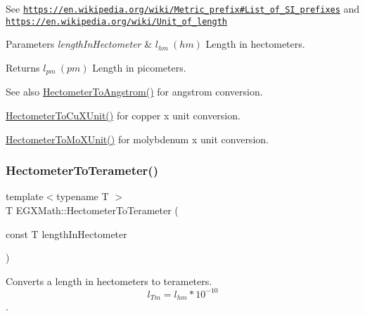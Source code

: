 See \href{https://en.wikipedia.org/wiki/Metric_prefix#List_of_SI_prefixes}{\tt https\+://en.\+wikipedia.\+org/wiki/\+Metric\+\_\+prefix\#\+List\+\_\+of\+\_\+\+S\+I\+\_\+prefixes} and \href{https://en.wikipedia.org/wiki/Unit_of_length}{\tt https\+://en.\+wikipedia.\+org/wiki/\+Unit\+\_\+of\+\_\+length} 
\begin{DoxyParams}{Parameters}
{\em length\+In\+Hectometer} & $ l_{hm}\ (hm)$ Length in hectometers. \\
\hline
\end{DoxyParams}
\begin{DoxyReturn}{Returns}
$ l_{pm}\ (pm)$ Length in picometers. 
\end{DoxyReturn}
\begin{DoxySeeAlso}{See also}
\mbox{\hyperlink{group___e_g_x_math-_conversions-_length_conversions-_hectometer-_non-_s_i_gad1296c0169aa8a99802a30b65a2ea516}{Hectometer\+To\+Angstrom()}} for angstrom conversion. 

\mbox{\hyperlink{group___e_g_x_math-_conversions-_length_conversions-_hectometer-_non-_s_i_ga5c1d570e3bec185a917f3987d45529be}{Hectometer\+To\+Cu\+X\+Unit()}} for copper x unit conversion. 

\mbox{\hyperlink{group___e_g_x_math-_conversions-_length_conversions-_hectometer-_non-_s_i_gac2840604040746ae9a4c51fd1bb3e6f6}{Hectometer\+To\+Mo\+X\+Unit()}} for molybdenum x unit conversion. 
\end{DoxySeeAlso}
\mbox{\label{group___e_g_x_math-_conversions-_length_conversions-_hectometer-_s_i_ga12cec764ceb52e7120b503f8f12ed4a2}} 
\subsubsection{\texorpdfstring{Hectometer\+To\+Terameter()}{HectometerToTerameter()}}
{\footnotesize\ttfamily template$<$typename T $>$ \\
T E\+G\+X\+Math\+::\+Hectometer\+To\+Terameter (\begin{DoxyParamCaption}\item[{const T}]{length\+In\+Hectometer }\end{DoxyParamCaption})}



Converts a length in hectometers to terameters. \[ l_{Tm}=l_{hm} * 10^{-10} \]. 

